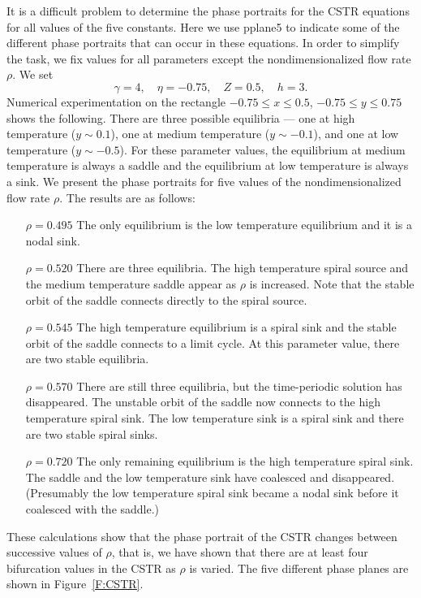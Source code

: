 It is a difficult problem to determine the phase portraits for
the CSTR equations for all values of the five constants. Here we
use {\sf pplane5} to indicate some of the different phase
portraits that can occur in these equations.  In order to
simplify the task, we fix values for all parameters except
the nondimensionalized flow rate $\rho$.  We set
\begin{equation}   \label{e:CSTRparam}
\gamma=4, \quad \eta=-0.75, \quad Z=0.5, \quad h =3.
\end{equation}
Numerical experimentation on the rectangle $-0.75\leq x
\leq 0.5$, $-0.75\leq y\leq 0.75$ shows the following.  There are 
three possible equilibria --- one at high temperature ($y\sim 0.1$), 
one at medium temperature ($y\sim -0.1$), and one at low
temperature ($y\sim -0.5$).  For these parameter values, the 
equilibrium at medium temperature is always a saddle and the 
equilibrium at low temperature is always a 
sink.  We present the 
phase portraits for five values of the nondimensionalized 
flow rate
$\rho$.  The results are as follows:  
\begin{itemize}
\item[$\rho=0.495$] The only equilibrium is the low temperature 
equilibrium and it is a nodal sink. 
\item[$\rho=0.520$] There are three equilibria. The high 
temperature spiral source and the medium temperature saddle appear
as $\rho$ is increased.  Note that the stable orbit of the 
saddle connects directly to the spiral source.
\item[$\rho=0.545$] The high temperature equilibrium is a spiral 
sink and the stable orbit of the saddle connects to a limit 
cycle.  At this parameter value, there are two stable equilibria.
 
\item[$\rho=0.570$] There are still three equilibria, but the 
time-periodic solution has disappeared.  The unstable orbit of 
the saddle now connects to the high temperature spiral sink. The
low temperature sink is a spiral sink and there are two stable
spiral sinks. 
\item[$\rho=0.720$] The only remaining equilibrium is the high
temperature spiral sink.  The saddle and the low temperature 
sink have coalesced and disappeared.  (Presumably the low temperature 
spiral sink became a nodal sink before it coalesced with the saddle.)
\end{itemize}

These calculations show that the phase portrait of the CSTR changes 
between successive values of $\rho$, that is, we have shown that 
there are at least four bifurcation values in the CSTR as $\rho$ 
is varied.  The five different phase planes are shown in Figure~\ref{F:CSTR}.


